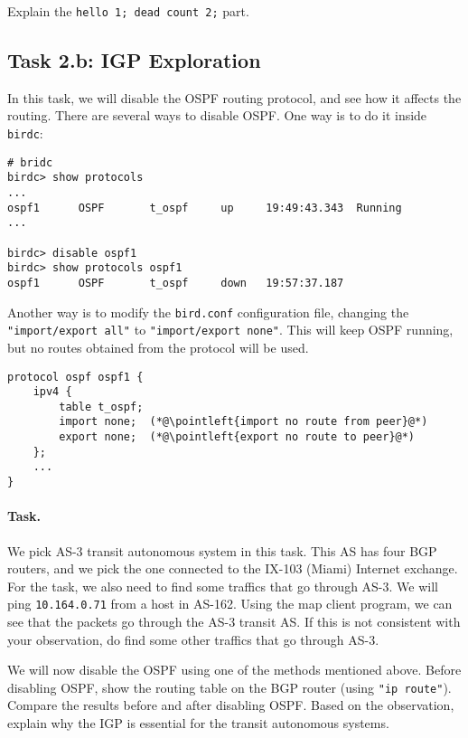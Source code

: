 Explain the \texttt{hello 1; dead count 2;} part. 



\subsection{Task 2.b: IGP Exploration} 

In this task, we will disable the OSPF routing protocol, and see 
how it affects the routing. There are several ways to disable
OSPF. One way is to do it inside \texttt{birdc}: 

\begin{lstlisting}
# bridc
birdc> show protocols
...
ospf1      OSPF       t_ospf     up     19:49:43.343  Running
...

birdc> disable ospf1
birdc> show protocols ospf1
ospf1      OSPF       t_ospf     down   19:57:37.187
\end{lstlisting}
 
Another way is to modify the \texttt{bird.conf} configuration file,
changing the \texttt{"import/export all"} to 
\texttt{"import/export none"}. This will keep OSPF running, but  
no routes obtained from the protocol will be used. 

\begin{lstlisting}
protocol ospf ospf1 {
    ipv4 {
        table t_ospf;
        import none;  (*@\pointleft{import no route from peer}@*) 
        export none;  (*@\pointleft{export no route to peer}@*) 
    };
    ...
}
\end{lstlisting}
 

\paragraph{Task.} We pick AS-3 transit autonomous system in this 
task. This AS has four BGP routers, and we pick the one 
connected to the IX-103 (Miami) Internet exchange.
For the task, we also need to find some traffics that 
go through AS-3. 
We will ping \texttt{10.164.0.71} from a host in AS-162. Using the 
map client program, we can see that the packets go through
the AS-3 transit AS. If this is not consistent with your observation,
do find some other traffics that go through AS-3. 


We will now disable the OSPF using one of the methods mentioned above.
Before disabling OSPF, show the routing table 
on the BGP router (using \texttt{"ip route"}). Compare the 
results before and after disabling OSPF. Based on the 
observation, explain why the IGP is essential for the transit 
autonomous systems. 


